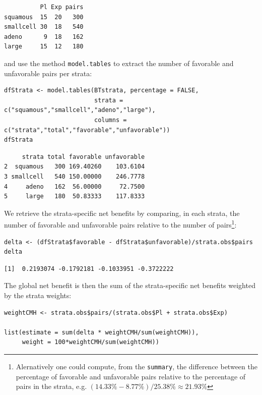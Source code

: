\documentclass[12pt]{article}
\begin{document}
\begin{verbatim}
          Pl Exp pairs
squamous  15  20   300
smallcell 30  18   540
adeno      9  18   162
large     15  12   180
\end{verbatim}


and use the method \texttt{model.tables} to extract the number of favorable and unfavorable
pairs per strata:
\lstset{language=r,label= ,caption= ,captionpos=b,numbers=none}
\begin{lstlisting}
dfStrata <- model.tables(BTstrata, percentage = FALSE,
                         strata = c("squamous","smallcell","adeno","large"),
                         columns = c("strata","total","favorable","unfavorable"))
dfStrata
\end{lstlisting}

\begin{verbatim}
     strata total favorable unfavorable
2  squamous   300 169.40260    103.6104
3 smallcell   540 150.00000    246.7778
4     adeno   162  56.00000     72.7500
5     large   180  50.83333    117.8333
\end{verbatim}


We retrieve the strata-specific net benefits by comparing, in each
strata, the number of favorable and unfavorable pairs relative to the
number of pairs\footnote{Alernatively one could compute, from the \texttt{summary}, the difference
between the percentage of favorable and unfavorable pairs relative to
the percentage of pairs in the strata, e.g. \((14.33\%-8.77\%)/25.38\%
\approx 21.93\%\)}:
\lstset{language=r,label= ,caption= ,captionpos=b,numbers=none}
\begin{lstlisting}
delta <- (dfStrata$favorable - dfStrata$unfavorable)/strata.obs$pairs
delta
\end{lstlisting}

\begin{verbatim}
[1]  0.2193074 -0.1792181 -0.1033951 -0.3722222
\end{verbatim}




The global net benefit is then the sum of the strata-specific net
benefits weighted by the strata weights:
\lstset{language=r,label= ,caption= ,captionpos=b,numbers=none}
\begin{lstlisting}
weightCMH <- strata.obs$pairs/(strata.obs$Pl + strata.obs$Exp)

list(estimate = sum(delta * weightCMH/sum(weightCMH)),
     weight = 100*weightCMH/sum(weightCMH))
\end{lstlisting}
\end{document}
